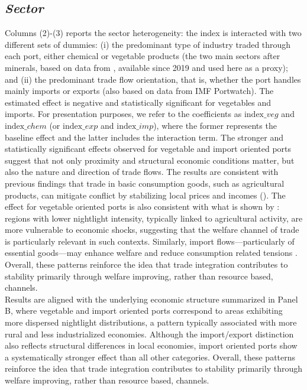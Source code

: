 \subsection{\textit{Sector}}
Columns (2)-(3) reports the sector heterogeneity: the index is interacted with two different sets of dummies: (i) the predominant type of industry traded through each port, either chemical or vegetable products (the two main sectors after minerals, based on data from \textcite{imfportwatch2025}, available since 2019 and used here as a proxy); and (ii) the predominant trade flow orientation, that is, whether the port handles mainly imports or exports (also based on data from IMF Portwatch). The estimated effect is negative and statistically significant for vegetables and imports. For presentation purposes, we refer to the coefficients as $\text{index}\_{veg}$ and $\text{index}\_{chem}$ (or $\text{index}\_{exp}$ and $\text{index}\_{imp}$), where the former represents the baseline effect and the latter includes the interaction term.
The stronger and statistically significant effects observed for vegetable and import oriented ports suggest that not only proximity and structural economic conditions matter, but also the nature and direction of trade flows. The results are consistent with previous findings that trade in basic consumption goods, such as agricultural products, can mitigate conflict by stabilizing local prices and incomes (\parencite{mcguirk2020economic}). The effect for vegetable oriented ports is also  consistent with what is shown by \textcite{amodio2024trade}: regions with lower nightlight intensity, typically linked to agricultural activity, are more vulnerable to economic shocks, suggesting that the welfare channel of trade is particularly relevant in such contexts. Similarly, import flows—particularly of essential goods—may enhance welfare and reduce consumption related tensions \parencite{bruckner2010international, dube2013commodity}. Overall, these patterns reinforce the idea that trade integration contributes to stability primarily through welfare improving, rather than resource based, channels.\\
Results are aligned with the underlying economic structure summarized in Panel B, where vegetable and import oriented ports correspond to areas exhibiting more dispersed nightlight distributions, a pattern typically associated with more rural and less industrialized economies. Although the import/export distinction also reflects structural differences in local economies, import oriented ports show a systematically stronger effect than all other categories. Overall, these patterns reinforce the idea that trade integration contributes to stability primarily through welfare improving, rather than resource based, channels. \\

